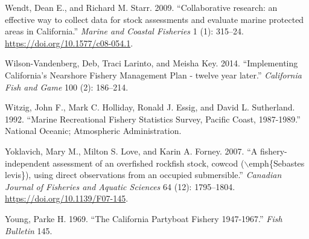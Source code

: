 \documentclass[
  english,
  a4paper,
]{article}
\newlength{\cslhangindent}
\newlength{\cslentryspacingunit} %
\newenvironment{CSLReferences}[2] %
 {%
  \setlength{\parindent}{0pt}
  \ifodd #1
  \let\oldpar\par
  \def\par{\hangindent=\cslhangindent\oldpar}
  \fi
  \setlength{\parskip}{#2\cslentryspacingunit}
 }%
 {}
\begin{document}
\begin{CSLReferences}{1}{0}
\leavevmode{}%
Wendt, Dean E., and Richard M. Starr. 2009. {``{Collaborative research: an effective way to collect data for stock assessments and evaluate marine protected areas in California}.''} \emph{Marine and Coastal Fisheries} 1 (1): 315--24. \url{https://doi.org/10.1577/c08-054.1}.

\leavevmode{}%
Wilson-Vandenberg, Deb, Traci Larinto, and Meisha Key. 2014. {``{Implementing California's Nearshore Fishery Management Plan - twelve year later}.''} \emph{California Fish and Game} 100 (2): 186--214.

\leavevmode{}%
Witzig, John F., Mark C. Holliday, Ronald J. Essig, and David L. Sutherland. 1992. {``{Marine Recreational Fishery Statistics Survey, Pacific Coast, 1987-1989}.''} National Oceanic; Atmospheric Administration.

\leavevmode{}%
Yoklavich, Mary M., Milton S. Love, and Karin A. Forney. 2007. {``{A fishery-independent assessment of an overfished rockfish stock, cowcod (\(\backslash\)emph{\{}Sebastes levis{\}}), using direct observations from an occupied submersible}.''} \emph{Canadian Journal of Fisheries and Aquatic Sciences} 64 (12): 1795--1804. \url{https://doi.org/10.1139/F07-145}.

\leavevmode{}%
Young, Parke H. 1969. {``{The California Partyboat Fishery 1947-1967}.''} \emph{Fish Bulletin} 145.

\end{CSLReferences}
\end{document}
